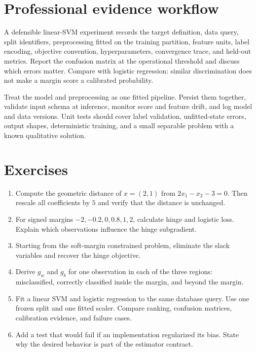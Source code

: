 \section{Professional evidence workflow}

A defensible linear-SVM experiment records the target definition, data query,
split identifiers, preprocessing fitted on the training partition, feature
units, label encoding, objective convention, hyperparameters, convergence
trace, and held-out metrics. Report the confusion matrix at the operational
threshold and discuss which errors matter. Compare with logistic regression:
similar discrimination does not make a margin score a calibrated probability.

\begin{professionalbox}
Treat the model and preprocessing as one fitted pipeline. Persist them
together, validate input schema at inference, monitor score and feature drift,
and log model and data versions. Unit tests should cover label validation,
unfitted-state errors, output shapes, deterministic training, and a small
separable problem with a known qualitative solution.
\end{professionalbox}

\section{Exercises}

\begin{enumerate}
  \item Compute the geometric distance of $x=(2,1)$ from
  $2x_1-x_2-3=0$. Then rescale all coefficients by $5$ and verify that the
  distance is unchanged.
  \item For signed margins $-2,-0.2,0,0.8,1,2$, calculate hinge and logistic
  loss. Explain which observations influence the hinge subgradient.
  \item Starting from the soft-margin constrained problem, eliminate the slack
  variables and recover the hinge objective.
  \item Derive $g_w$ and $g_b$ for one observation in each of the three regions:
  misclassified, correctly classified inside the margin, and beyond the margin.
  \item Fit a linear SVM and logistic regression to the same database query.
  Use one frozen split and one fitted scaler. Compare ranking, confusion
  matrices, calibration evidence, and failure cases.
  \item Add a test that would fail if an implementation regularized its bias.
  State why the desired behavior is part of the estimator contract.
\end{enumerate}

